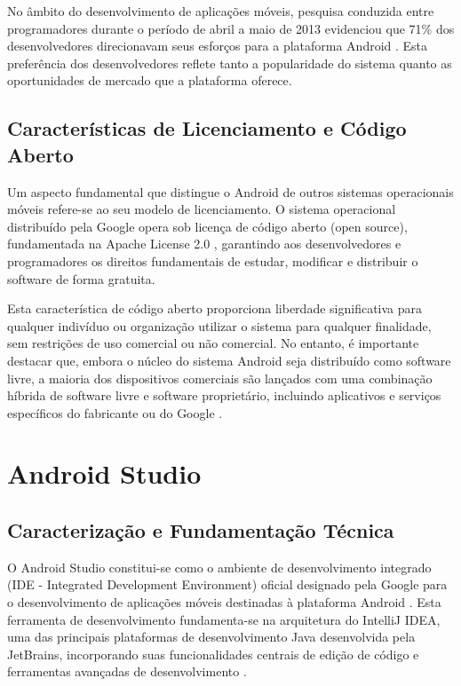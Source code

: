 No âmbito do desenvolvimento de aplicações móveis, pesquisa conduzida entre programadores durante o período de abril a maio de 2013 evidenciou que 71\% dos desenvolvedores direcionavam seus esforços para a plataforma Android \cite{developereconomics2013}. Esta preferência dos desenvolvedores reflete tanto a popularidade do sistema quanto as oportunidades de mercado que a plataforma oferece.

\subsection{Características de Licenciamento e Código Aberto}

Um aspecto fundamental que distingue o Android de outros sistemas operacionais móveis refere-se ao seu modelo de licenciamento. O sistema operacional distribuído pela Google opera sob licença de código aberto (open source), fundamentada na Apache License 2.0 \cite{opensource2023}, garantindo aos desenvolvedores e programadores os direitos fundamentais de estudar, modificar e distribuir o software de forma gratuita.

Esta característica de código aberto proporciona liberdade significativa para qualquer indivíduo ou organização utilizar o sistema para qualquer finalidade, sem restrições de uso comercial ou não comercial. No entanto, é importante destacar que, embora o núcleo do sistema Android seja distribuído como software livre, a maioria dos dispositivos comerciais são lançados com uma combinação híbrida de software livre e software proprietário, incluindo aplicativos e serviços específicos do fabricante ou do Google \cite{lee2022}.

\section{Android Studio}
\subsection{Caracterização e Fundamentação Técnica}

O Android Studio constitui-se como o ambiente de desenvolvimento integrado (IDE - Integrated Development Environment) oficial designado pela Google para o desenvolvimento de aplicações móveis destinadas à plataforma Android \cite{google2023androidstudio}. Esta ferramenta de desenvolvimento fundamenta-se na arquitetura do IntelliJ IDEA, uma das principais plataformas de desenvolvimento Java desenvolvida pela JetBrains, incorporando suas funcionalidades centrais de edição de código e ferramentas avançadas de desenvolvimento \cite{jetbrains2023intellij}.

